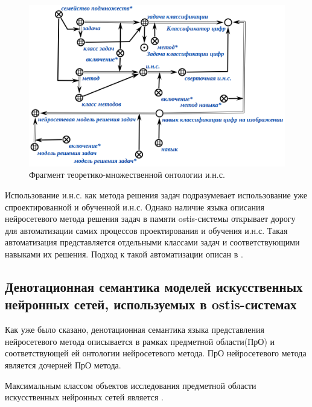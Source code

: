 \begin{figure}[H]
	\centering
	\includegraphics[scale=0.5]{author/part3/figures/actions_concepts.png}
	\caption{Фрагмент теоретико-множественной онтологии и.н.с.}
	\label{fig:actions_concepts}
\end{figure}

Использование и.н.с. как метода решения задач подразумевает использование уже спроектированной и обученной и.н.с. Однако наличие языка описания нейросетевого метода решения задач в памяти ostis-системы открывает дорогу для автоматизации самих процессов проектирования и обучения и.н.с. Такая автоматизация представляется отдельными классами задач и соответствующими навыками их решения. Подход к такой автоматизации описан в \textbf{}.

\subsection{Денотационная семантика моделей искусственных нейронных сетей, используемых в ostis-системах}

Как уже было сказано, денотационная семантика языка представления нейросетевого метода описывается в рамках предметной области(ПрО) и соответствующей ей онтологии нейросетевого метода. ПрО нейросетевого метода является дочерней ПрО метода.

Максимальным классом объектов исследования предметной области искусственных нейронных сетей является .

\begin{SCn}
\end{SCn}

